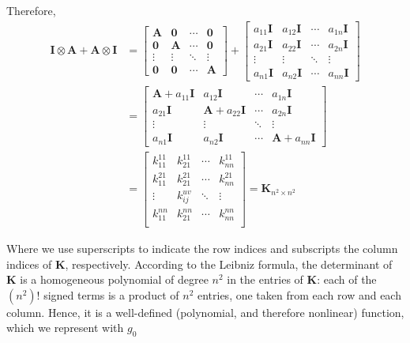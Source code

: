 \documentclass{article}
\begin{document}
Therefore,
\begin{equation}
\begin{aligned}
\mathbf{I} \otimes \mathbf{A}+ \mathbf{A} \otimes \mathbf{I} &=
\left[ \begin{array}{cccc}
\mathbf{A} & \mathbf{0} & \cdots & \mathbf{0} \\
\mathbf{0} & \mathbf{A} & \cdots & \mathbf{0} \\
\vdots & \vdots & \ddots & \vdots \\
\mathbf{0} & \mathbf{0} & \cdots & \mathbf{A}
\end{array} \right] +
\left[ \begin{array}{cccc}
a_{11}\mathbf{I} & a_{12}\mathbf{I} & \cdots & a_{1n}\mathbf{I} \\
a_{21}\mathbf{I} & a_{22}\mathbf{I} & \cdots & a_{2n}\mathbf{I} \\
\vdots & \vdots & \ddots & \vdots \\
a_{n1}\mathbf{I} & a_{n2}\mathbf{I} & \cdots & a_{nn}\mathbf{I}
\end{array} \right] \\
&=\left[ \begin{array}{cccc}
\mathbf{A}+a_{11}\mathbf{I} & a_{12}\mathbf{I} & \cdots & a_{1n}\mathbf{I} \\
a_{21}\mathbf{I} & \mathbf{A}+a_{22}\mathbf{I} & \cdots & a_{2n}\mathbf{I} \\
\vdots & \vdots & \ddots & \vdots \\
a_{n1}\mathbf{I} & a_{n2}\mathbf{I} & \cdots & \mathbf{A}+a_{nn}\mathbf{I}
\end{array} \right] \\
&=\left[ \begin{array}{cccc}
k_{11}^{11} & k_{21}^{11} & \cdots & k_{nn}^{11} \\
k_{11}^{21} & k_{21}^{21} & \cdots & k_{nn}^{21} \\
\vdots & k_{ij}^{uv} & \ddots & \vdots \\
k_{11}^{nn} & k_{21}^{nn} & \cdots & k_{nn}^{nn} \\
\end{array} \right]=\mathbf{K}_{n^2 \times n^2}
\end{aligned}
\end{equation}



Where we use superscripts to indicate the row indices and subscripts the column indices of $\mathbf{K}$, respectively. According to the Leibniz formula, the determinant of $\mathbf{K}$ is a homogeneous polynomial of degree $n^2$ in the entries of $\mathbf{K}$: each of the $(n^2)!$ signed terms is a product of $n^2$ entries, one taken from each row and each column. Hence, it is a well-defined (polynomial, and therefore nonlinear) function, which we represent with $g_{0}$
\end{document}
